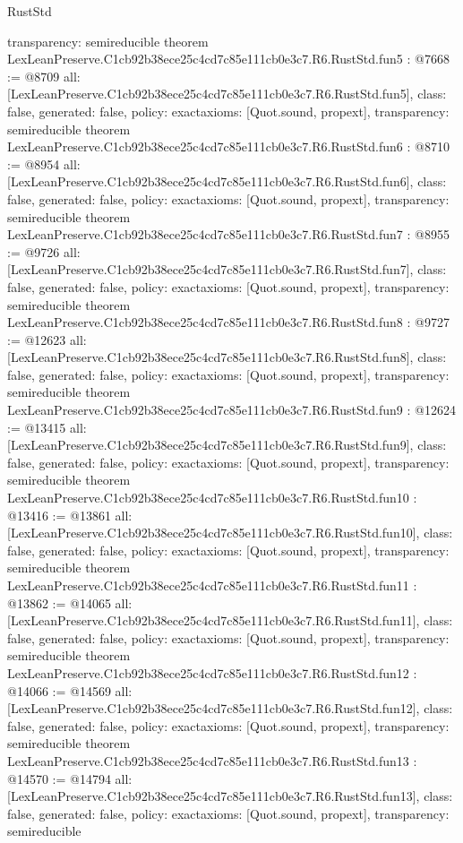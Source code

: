 \begin{lexlean}{RustStd}
\begin{coremodule}
{  transparency: semireducible
}
theorem LexLeanPreserve.C1cb92b38ece25c4cd7c85e111cb0e3c7.R6.RustStd.fun5 : @7668 := @8709 {
  all: [LexLeanPreserve.C1cb92b38ece25c4cd7c85e111cb0e3c7.R6.RustStd.fun5],
  class: false,
  generated: false,
  policy: exact{axioms: [Quot.sound, propext]},
  transparency: semireducible
}
theorem LexLeanPreserve.C1cb92b38ece25c4cd7c85e111cb0e3c7.R6.RustStd.fun6 : @8710 := @8954 {
  all: [LexLeanPreserve.C1cb92b38ece25c4cd7c85e111cb0e3c7.R6.RustStd.fun6],
  class: false,
  generated: false,
  policy: exact{axioms: [Quot.sound, propext]},
  transparency: semireducible
}
theorem LexLeanPreserve.C1cb92b38ece25c4cd7c85e111cb0e3c7.R6.RustStd.fun7 : @8955 := @9726 {
  all: [LexLeanPreserve.C1cb92b38ece25c4cd7c85e111cb0e3c7.R6.RustStd.fun7],
  class: false,
  generated: false,
  policy: exact{axioms: [Quot.sound, propext]},
  transparency: semireducible
}
theorem LexLeanPreserve.C1cb92b38ece25c4cd7c85e111cb0e3c7.R6.RustStd.fun8 : @9727 := @12623 {
  all: [LexLeanPreserve.C1cb92b38ece25c4cd7c85e111cb0e3c7.R6.RustStd.fun8],
  class: false,
  generated: false,
  policy: exact{axioms: [Quot.sound, propext]},
  transparency: semireducible
}
theorem LexLeanPreserve.C1cb92b38ece25c4cd7c85e111cb0e3c7.R6.RustStd.fun9 : @12624 := @13415 {
  all: [LexLeanPreserve.C1cb92b38ece25c4cd7c85e111cb0e3c7.R6.RustStd.fun9],
  class: false,
  generated: false,
  policy: exact{axioms: [Quot.sound, propext]},
  transparency: semireducible
}
theorem LexLeanPreserve.C1cb92b38ece25c4cd7c85e111cb0e3c7.R6.RustStd.fun10 : @13416 := @13861 {
  all: [LexLeanPreserve.C1cb92b38ece25c4cd7c85e111cb0e3c7.R6.RustStd.fun10],
  class: false,
  generated: false,
  policy: exact{axioms: [Quot.sound, propext]},
  transparency: semireducible
}
theorem LexLeanPreserve.C1cb92b38ece25c4cd7c85e111cb0e3c7.R6.RustStd.fun11 : @13862 := @14065 {
  all: [LexLeanPreserve.C1cb92b38ece25c4cd7c85e111cb0e3c7.R6.RustStd.fun11],
  class: false,
  generated: false,
  policy: exact{axioms: [Quot.sound, propext]},
  transparency: semireducible
}
theorem LexLeanPreserve.C1cb92b38ece25c4cd7c85e111cb0e3c7.R6.RustStd.fun12 : @14066 := @14569 {
  all: [LexLeanPreserve.C1cb92b38ece25c4cd7c85e111cb0e3c7.R6.RustStd.fun12],
  class: false,
  generated: false,
  policy: exact{axioms: [Quot.sound, propext]},
  transparency: semireducible
}
theorem LexLeanPreserve.C1cb92b38ece25c4cd7c85e111cb0e3c7.R6.RustStd.fun13 : @14570 := @14794 {
  all: [LexLeanPreserve.C1cb92b38ece25c4cd7c85e111cb0e3c7.R6.RustStd.fun13],
  class: false,
  generated: false,
  policy: exact{axioms: [Quot.sound, propext]},
  transparency: semireducible
}
\end{coremodule}
\end{lexlean}
